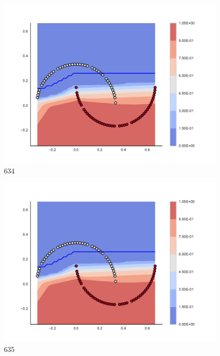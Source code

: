 \begin{subfigure}[b]{0.09\textwidth}
    \includegraphics[clip, trim=2.35cm 1.75cm 4.5cm 0cm,width=\textwidth]{img/convergence/634.pdf}
    \caption{634}
    \label{fig:convergence_634}
\end{subfigure}
%
\begin{subfigure}[b]{0.09\textwidth}
    \includegraphics[clip, trim=2.35cm 1.75cm 4.5cm 0cm,width=\textwidth]{img/convergence/635.pdf}
    \caption{635}
    \label{fig:convergence_635}
\end{subfigure}
%
